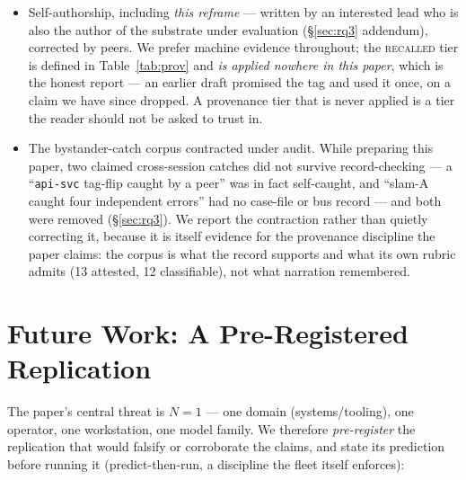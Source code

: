 \documentclass[10pt,conference]{IEEEtran}   %
\begin{document}
\begin{itemize}
\item Self-authorship, including \emph{this reframe} --- written by an interested lead who is
  also the author of the substrate under evaluation (\S\ref{sec:rq3} addendum),
  corrected by peers. We prefer machine evidence throughout; the \textsc{recalled} tier is defined in Table~\ref{tab:prov} and \emph{is applied nowhere in this paper}, which is the honest report --- an earlier draft promised the tag and used it once, on a claim we have since dropped. A provenance tier that is never applied is a tier the reader should not be asked to trust in.
\item The bystander-catch corpus contracted under audit. While preparing this paper, two
  claimed cross-session catches did not survive record-checking --- a ``\texttt{api-svc} tag-flip
  caught by a peer'' was in fact self-caught, and ``slam-A caught four independent errors'' had no
  case-file or bus record --- and both were removed (\S\ref{sec:rq3}). We report the contraction rather than
  quietly correcting it, because it is itself evidence for the provenance discipline the paper claims:
  the corpus is what the record supports and what its own rubric admits (13 attested, 12 classifiable), not what narration remembered.
\end{itemize}

\section{Future Work: A Pre-Registered Replication}
\label{sec:future}
The paper's central threat is $N{=}1$ --- one domain (systems/tooling), one operator, one
workstation, one model family. We therefore \emph{pre-register} the replication that would
falsify or corroborate the claims, and state its prediction before running it (predict-then-run,
a discipline the fleet itself enforces):
\end{document}
